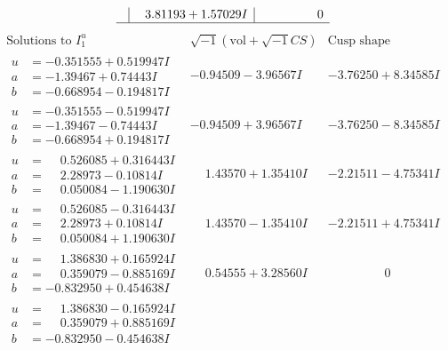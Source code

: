 \documentclass[1p]{elsarticle_modified}
\theoremstyle{definition}
\newcommand{\I}{\sqrt{-1}}
\begin{document}
$$\begin{array}{c|c|c}
 & \phantom{-}3.81193 + 1.57029 I & \phantom{-0.000000 } 0\\
 \hline 
 \end{array}$$\newpage$$\begin{array}{c|c|c}  
\text{Solutions to }I^u_{1}& \I (\text{vol} + \sqrt{-1}CS) & \text{Cusp shape}\\
 \hline 
\begin{aligned}
u &= -0.351555 + 0.519947 I \\
a &= -1.39467 + 0.74443 I \\
b &= -0.668954 - 0.194817 I\end{aligned}
 & -0.94509 - 3.96567 I & -3.76250 + 8.34585 I \\ \hline\begin{aligned}
u &= -0.351555 - 0.519947 I \\
a &= -1.39467 - 0.74443 I \\
b &= -0.668954 + 0.194817 I\end{aligned}
 & -0.94509 + 3.96567 I & -3.76250 - 8.34585 I \\ \hline\begin{aligned}
u &= \phantom{-}0.526085 + 0.316443 I \\
a &= \phantom{-}2.28973 - 0.10814 I \\
b &= \phantom{-}0.050084 - 1.190630 I\end{aligned}
 & \phantom{-}1.43570 + 1.35410 I & -2.21511 - 4.75341 I \\ \hline\begin{aligned}
u &= \phantom{-}0.526085 - 0.316443 I \\
a &= \phantom{-}2.28973 + 0.10814 I \\
b &= \phantom{-}0.050084 + 1.190630 I\end{aligned}
 & \phantom{-}1.43570 - 1.35410 I & -2.21511 + 4.75341 I \\ \hline\begin{aligned}
u &= \phantom{-}1.386830 + 0.165924 I \\
a &= \phantom{-}0.359079 - 0.885169 I \\
b &= -0.832950 + 0.454638 I\end{aligned}
 & \phantom{-}0.54555 + 3.28560 I & \phantom{-0.000000 } 0 \\ \hline\begin{aligned}
u &= \phantom{-}1.386830 - 0.165924 I \\
a &= \phantom{-}0.359079 + 0.885169 I \\
b &= -0.832950 - 0.454638 I\end{aligned}

\end{array}$$
\end{document}
